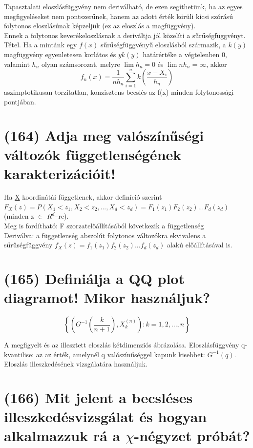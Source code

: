 \documentclass[12p]{article}
\begin{document}
Tapasztalati eloszlásfüggvény nem deriválható, de ezen segíthetünk, ha az egyes megfigyeléseket nem pontszerűnek, hanem az adott érték körüli kicsi szórású folytonos eloszlásúnak képzeljük (ez az eloszlás a magfüggvény).\\
Ennek a folytonos keverékeloszlásnak a deriváltja jól közelíti a sűrűségfüggvényt.\\
Tétel. Ha a mintánk egy $f(x)$ sűrűségfüggvényű
eloszlásból származik, a $k(y)$ magfüggvény
egyenletesen korlátos és $yk(y)$ határértéke a
végtelenben 0, valamint $h_n$ olyan számsorozat,
melyre $\lim h_n = 0$ és $\lim nh_n = \infty$, akkor
$$f_n(x) = \frac{1}{nh_n} \sum^{n}_{i=1}k\left(\frac{x-X_i}{h_n}\right)$$ 
aszimptotikusan torzítatlan, konzisztens becslés az f(x) minden folytonossági pontjában.

\section{(164) Adja meg valószínűségi változók függetlenségének karakterizációit!}

Ha \underline{X} koordinátái függetlenek, akkor definíció szerint\\
$F_X(z)=P(X_1<z_1, X_2< z_2,..., X_d<z_d)=F_1(z_1)F_2(z_2)...F_d(z_d)$ (minden z $\in$ $R^d$–re).\\
Meg is fordítható: F szorzatelőállításából következik a függetlenség\\
Deriválva: a függetlenség abszolút folytonos változókra ekvivalens a sűrűségfüggvény 
$f_X(z)=f_1(z_1)f_2(z_2)...f_d(z_d)$ alakú előállításával is.

\section{(165) Definiálja a QQ plot diagramot! Mikor használjuk?}

$$\left\{\left(G^{-1}\left(\frac{k}{n+1}\right), X_k^{(n)}\right):k=1,2,...,n\right\}$$

A megfigyelt és az illesztett eloszlás kétdimenziós ábrázolása. Eloszlásfüggvény q-kvantilise: az az érték, amelynél q valószínűséggel kapunk kisebbet: $G^{-1}(q)$.\\
Eloszlás illeszkedésének vizsgálatára használjuk.

\section{(166) Mit jelent a becsléses illeszkedésvizsgálat és hogyan alkalmazzuk rá a $\chi$-négyzet próbát?}
\end{document}
